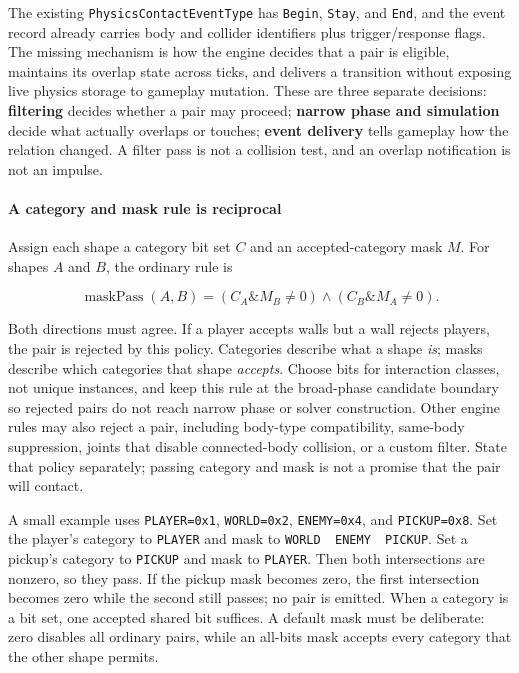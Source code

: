 The existing \texttt{PhysicsContactEventType} has \texttt{Begin}, \texttt{Stay}, and \texttt{End}, and the event record already carries body and collider identifiers plus trigger/response flags. The missing mechanism is how the engine decides that a pair is eligible, maintains its overlap state across ticks, and delivers a transition without exposing live physics storage to gameplay mutation. These are three separate decisions: \textbf{filtering} decides whether a pair may proceed; \textbf{narrow phase and simulation} decide what actually overlaps or touches; \textbf{event delivery} tells gameplay how the relation changed. A filter pass is not a collision test, and an overlap notification is not an impulse.

\paragraph{A category and mask rule is reciprocal}\label{a-category-and-mask-rule-is-reciprocal}

Assign each shape a category bit set \(C\) and an accepted-category mask \(M\). For shapes \(A\) and \(B\), the ordinary rule is

\[
\operatorname{maskPass}(A,B) = (C_A \mathbin{\&} M_B \ne 0) \land (C_B \mathbin{\&} M_A \ne 0).
\]

Both directions must agree. If a player accepts walls but a wall rejects players, the pair is rejected by this policy. Categories describe what a shape \emph{is}; masks describe which categories that shape \emph{accepts}. Choose bits for interaction classes, not unique instances, and keep this rule at the broad-phase candidate boundary so rejected pairs do not reach narrow phase or solver construction. Other engine rules may also reject a pair, including body-type compatibility, same-body suppression, joints that disable connected-body collision, or a custom filter. State that policy separately; passing category and mask is not a promise that the pair will contact.

A small example uses \texttt{PLAYER=0x1}, \texttt{WORLD=0x2}, \texttt{ENEMY=0x4}, and \texttt{PICKUP=0x8}. Set the player's category to \texttt{PLAYER} and mask to \texttt{WORLD\ \textbar{}\ ENEMY\ \textbar{}\ PICKUP}. Set a pickup's category to \texttt{PICKUP} and mask to \texttt{PLAYER}. Then both intersections are nonzero, so they pass. If the pickup mask becomes zero, the first intersection becomes zero while the second still passes; no pair is emitted. When a category is a bit set, one accepted shared bit suffices. A default mask must be deliberate: zero disables all ordinary pairs, while an all-bits mask accepts every category that the other shape permits.

